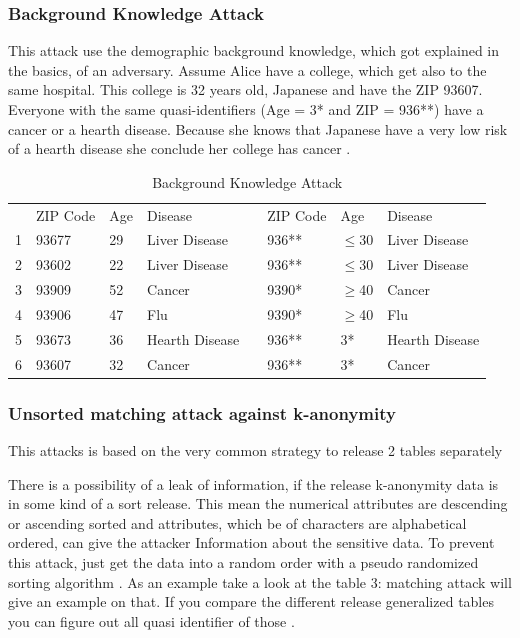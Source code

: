 \documentclass{llncs}
\begin{document}
\subsubsection{Background Knowledge Attack}
This attack use the demographic background knowledge, which got explained in the basics, of an adversary. Assume Alice have a college, which get also to the same hospital. This college is 32 years old, Japanese and have the ZIP 93607. Everyone with the same quasi-identifiers (Age = 3* and ZIP = 936**) have a cancer or a hearth disease. Because she knows that Japanese have a very low risk of a hearth disease she conclude her college has cancer \cite{ldiversity}.
\begin{table}[]
	\centering
	\caption{Background Knowledge Attack}
	\label{tablebackground}
	\begin{tabular}{@{}llllllll@{}}
		\cmidrule(r){1-4} \cmidrule(l){6-8}
		& ZIP Code & Age & Disease        &  & ZIP Code & Age      & Disease        \\ \cmidrule(r){1-4} \cmidrule(l){6-8} 
		1 & 93677    & 29  & Liver Disease   &  & 936**    & $\leq$30 & Liver Disease   \\
		2 & 93602    & 22  & Liver Disease   &  & 936**    & $\leq$30 & Liver Disease   \\
		3 & 93909    & 52  & Cancer         &  & 9390*    & $\geq$40 & Cancer         \\
		4 & 93906    & 47  & Flu            &  & 9390*    & $\geq$40 & Flu            \\
		5 & 93673    & 36  & Hearth Disease &  & 936**    & 3*       & Hearth Disease \\
		6 & 93607    & 32  & Cancer         &  & 936**    & 3*       & Cancer         \\ \cmidrule(r){1-4} \cmidrule(l){6-8} 
	\end{tabular}
\end{table}

\subsubsection{Unsorted matching attack against k-anonymity}
This attacks is based on the very common strategy to release 2 tables separately  

There is a possibility of a leak of information, if the release k-anonymity data is in some kind of a sort release. This mean the numerical attributes are descending or ascending sorted and attributes, which be of characters are alphabetical ordered, can give the attacker Information about the sensitive data. To prevent this attack, just get the data into a random order with a pseudo randomized sorting algorithm \cite{sweeney2002k}. As an example take a look at the table 3: matching attack  will give an example on that. If you compare the different release generalized tables you can figure out all quasi identifier of those \cite{sweeney2002k}.
\end{document}
